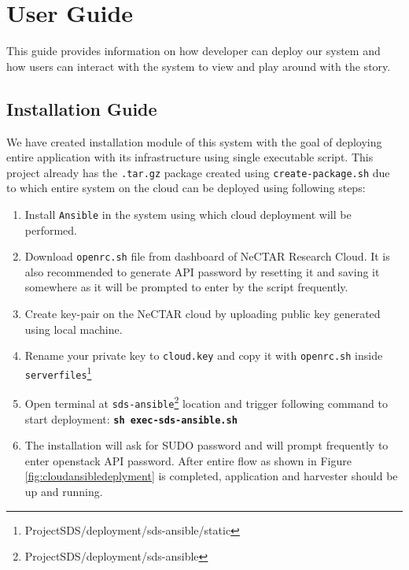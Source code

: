 \section{User Guide}
This guide provides information on how developer can deploy our system and how users can interact with the system to view and play around with the story.

\subsection{Installation Guide}
We have created installation module of this system with the goal of deploying entire application with its infrastructure using single executable script. This project already has the \texttt{.tar.gz} package created using \texttt{create-package.sh} due to which entire system on the cloud can be deployed using following steps:

\begin{enumerate}
    \item Install \texttt{Ansible} in the system using which cloud deployment will be performed.
    
    \item Download \texttt{openrc.sh} file from dashboard of NeCTAR Research Cloud. It is also recommended to generate API password by resetting it and saving it somewhere as it will be prompted to enter by the script frequently.
    
    \item Create key-pair on the NeCTAR cloud by uploading public key generated using local machine.
    
    \item Rename your private key to \texttt{cloud.key} and copy it with \texttt{openrc.sh} inside \texttt{serverfiles}\footnote{ProjectSDS/deployment/sds-ansible/static}
    
    \item Open terminal at \texttt{sds-ansible}\footnote{ProjectSDS/deployment/sds-ansible} location and trigger following command to start deployment: \textbf{\texttt{sh exec-sds-ansible.sh}}
    
    \item The installation will ask for SUDO password and will prompt frequently to enter openstack API password. After entire flow as shown in Figure \ref{fig:cloudansibledeplyment} is completed, application and harvester should be up and running.

\end{enumerate}


